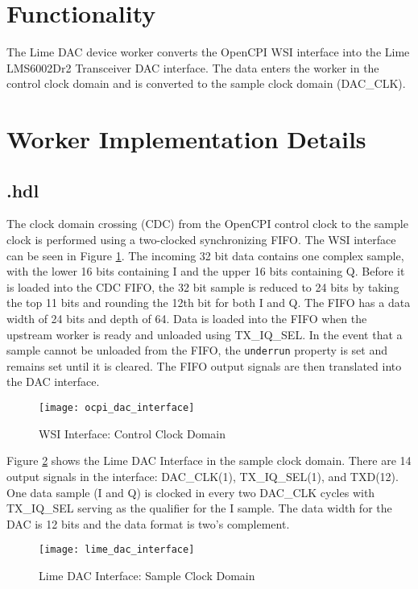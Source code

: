 \section*{Functionality}
\begin{flushleft}
	The Lime DAC device worker converts the OpenCPI WSI interface into the Lime LMS6002Dr2 Transceiver DAC interface. The data enters the worker in the control clock domain and is converted to the sample clock domain (DAC\_CLK).
\end{flushleft}

\section*{Worker Implementation Details}
\subsection*{\comp.hdl}
The clock domain crossing (CDC) from the OpenCPI control clock to the sample clock is performed using a two-clocked synchronizing FIFO. The WSI interface can be seen in Figure \ref{fig:ocpi_dac_interface}. The incoming 32 bit data contains one complex sample, with the lower 16 bits containing I and the upper 16 bits containing Q. Before it is loaded into the CDC FIFO, the 32 bit sample is reduced to 24 bits by taking the top 11 bits and rounding the 12th bit for both I and Q. The FIFO has a data width of 24 bits and depth of 64. Data is loaded into the FIFO when the upstream worker is ready and unloaded using TX\_IQ\_SEL. In the event that a sample cannot be unloaded from the FIFO, the \verb+underrun+ property is set and remains set until it is cleared. The FIFO output signals are then translated into the DAC interface.\par\bigskip
\begin{figure}[ht]
	\centering
	\texttt{[image: ocpi\_dac\_interface]}
	\caption{WSI Interface: Control Clock Domain}
	\label{fig:ocpi_dac_interface}
\end{figure}
\noindent Figure \ref{fig:lime_dac_interface} shows the Lime DAC Interface in the sample clock domain. There are 14 output signals in the interface: DAC\_CLK(1), TX\_IQ\_SEL(1), and TXD(12). One data sample (I and Q) is clocked in every two DAC\_CLK cycles with TX\_IQ\_SEL serving as the qualifier for the I sample. The data width for the DAC is 12 bits and the data format is two's complement.\par\bigskip\bigskip
\begin{figure}[ht]
	\centering
	\texttt{[image: lime\_dac\_interface]}
	\caption{Lime DAC Interface: Sample Clock Domain}
	\label{fig:lime_dac_interface}
\end{figure}
